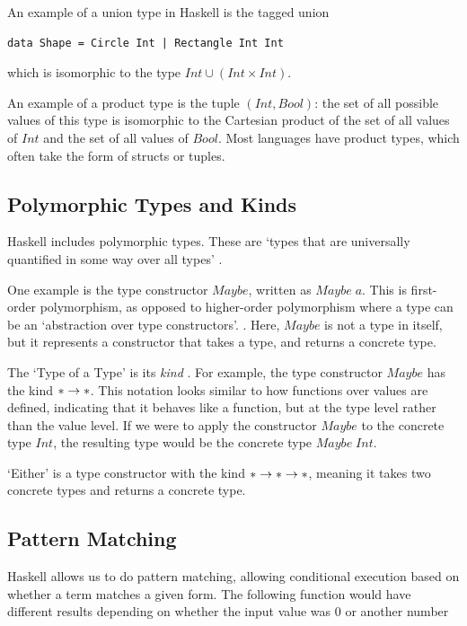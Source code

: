 An example of a union type in Haskell is the tagged union \begin{lstlisting}[language=SFL_unboxed]
data Shape = Circle Int | Rectangle Int Int
\end{lstlisting} 
\noindent which is isomorphic to the type \(Int \cup (Int \times Int)\). 

An example of a product type is the tuple \((Int, Bool)\): the set of all possible values of this type is isomorphic to the Cartesian product of the set of all values of \(Int\) and the set of all values of $Bool$. Most languages have product types, which often take the form of structs or tuples. 

\subsection{Polymorphic Types and Kinds}
Haskell includes polymorphic types. These are `types that are universally quantified in some way over all types' \cite{hudak1992gentle}. 

One example is the type constructor $Maybe$, written as \(Maybe\;a\). This is first-order polymorphism, as opposed to higher-order polymorphism where a type can be an `abstraction over type constructors'. \cite{yallop2014lightweightpoly}. Here, \(Maybe\) is not a type in itself, but it represents a constructor that takes a type, and returns a concrete type. 

The `Type of a Type' is its \emph{kind} \cite{pierce2002types}. For example, the type constructor $Maybe$ has the kind $* \rightarrow *$. This notation looks similar to how functions over values are defined, indicating that it behaves like a function, but at the type level rather than the value level. If we were to apply the constructor \(Maybe\) to the concrete type \(Int\), the resulting type would be the concrete type \(Maybe \;Int\). 

`Either' is a type constructor with the kind $* \rightarrow * \rightarrow *$, meaning it takes two concrete types and returns a concrete type. 

\subsection{Pattern Matching}
\label{bg:haskell_pattern_match}
Haskell allows us to do pattern matching, allowing conditional execution based on whether a term matches a given form. The following function would have different results depending on whether the input value was 0 or another number

